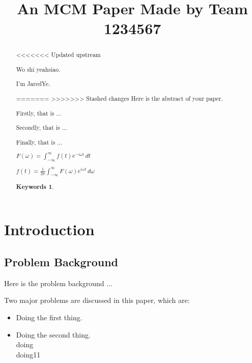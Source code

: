 \documentclass[12pt]{article}  %
\title{An MCM Paper Made by Team 1234567}  %
\newtheorem{keywords}{Keywords}
\begin{document}
\begin{abstract}

<<<<<<< Updated upstream




Wo shi yeahsiao.


I'm JaredYe.

=======
>>>>>>> Stashed changes
    Here is the abstract of your paper.

    Firstly, that is ...

    Secondly, that is ...

    Finally, that is ...

$F(\omega) = \int_{-\infty}^{\infty} f(t) e^{-i \omega t} \, dt$


$f(t) = \frac{1}{2\pi} \int_{-\infty}^{\infty} F(\omega) e^{i \omega t} \, d\omega$

\begin{keywords}
\end{keywords}
\end{abstract}

\maketitle  %
\tableofcontents  %


\section{Introduction}
\subsection{Problem Background}
Here is the problem background ...

Two major problems are discussed in this paper, which are:
\begin{itemize}
    \item Doing the first thing.
    \item Doing the second thing.\\doing\\    doing11
    
\end{itemize}
\end{document}
